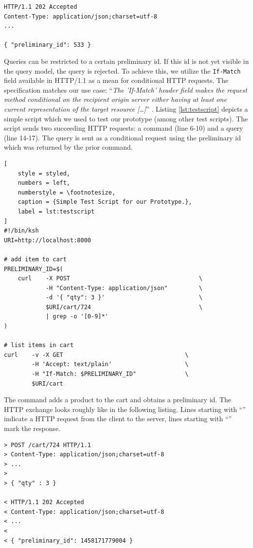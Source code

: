 \begin{lstlisting}[style=styled]
HTTP/1.1 202 Accepted 
Content-Type: application/json;charset=utf-8
...

{ "preliminary_id": 533 }
\end{lstlisting}

Queries can be restricted to a certain preliminary id. If this id is not yet 
visible in the query model, the query is rejected. To achieve this, we utilize 
the \texttt{If-Match} field available in HTTP/1.1 as a mean for conditional HTTP 
requests. The specification matches our use case:
``\emph{The 'If-Match' header field makes the request method conditional on
the recipient origin server either having at least one current representation of 
the target resource [\dots{}]}'' \cite{RFC7232}.
%
Listing \ref{lst:testscript} depicts a simple script which we used to test our 
prototype (among other test scripts). The script sends two succeeding HTTP 
requests: a command (line 6-10) and a query (line 14-17). The query is sent as a 
conditional request using the preliminary id which was returned by the prior command.

\pagebreak

\begin{lstlisting}[
	style = styled,
	numbers = left,
	numberstyle = \footnotesize,
	caption = {Simple Test Script for our Prototype.},
	label = lst:testscript
]
#!/bin/ksh
URI=http://localhost:8000

# add item to cart
PRELIMINARY_ID=$(
	curl	-X POST                                     \
		    -H "Content-Type: application/json"         \
		    -d '{ "qty": 3 }'                           \
		    $URI/cart/724                               \
		    | grep -o '[0-9]*'
)

# list items in cart
curl    -v -X GET                                   \
        -H 'Accept: text/plain'                     \
        -H "If-Match: $PRELIMINARY_ID"              \
        $URI/cart
\end{lstlisting}

The command adds a product to the cart and obtains a preliminary id. The HTTP 
exchange looks roughly like in the following listing. Lines starting with 
``\cmd{>}'' indicate a HTTP request from the client to the server, lines 
starting with ``\cmd{<}'' mark the response.

\begin{lstlisting}[style=styled]
> POST /cart/724 HTTP/1.1
> Content-Type: application/json;charset=utf-8
> ...
> 
> { "qty" : 3 }

< HTTP/1.1 202 Accepted 
< Content-Type: application/json;charset=utf-8
< ...
<
< { "preliminary_id": 1458171779004 }
\end{lstlisting}

